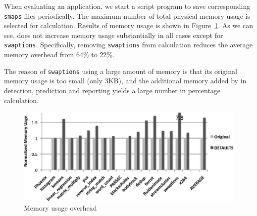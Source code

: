 When evaluating an application, we start a script program to save 
corresponding \texttt{smaps} files periodically. 
The maximum number of total physical memory usage is selected for calculation.
Results of memory usage is shown in Figure~\ref{fig:memusage}. As we can see,
 does not increase memory usage substantially in all cases except for \texttt{swaptions}. 
Specifically, removing \texttt{swaptions} from calculation reduces 
the average memory overhead from 64\% to 22\%. 

The reason of \texttt{swaptions} using a large amount of memory is that 
its original memory usage is too small (only 3KB), and 
the additional memory added by  in detection, prediction and
reporting yields a large number in percentage calculation. 

\begin{figure}
\begin{center} 
\includegraphics[width=5in]{fig/memusage}
\end{center}
\caption{Memory usage overhead}
\label{fig:memusage}
\end{figure}



